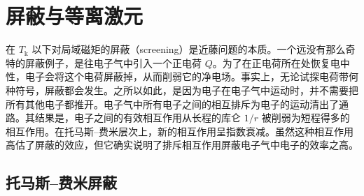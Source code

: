 \chapter{屏蔽与等离激元}

在 $T_{\mathrm{k}}$ 以下对局域磁矩的屏蔽（screening）是近藤问题的本质。一个远没有那么奇特的屏蔽例子，是往电子气中引入一个正电荷 $Q$。为了在正电荷所在处恢复电中性，电子会将这个电荷屏蔽掉，从而削弱它的净电场。事实上，无论试探电荷带何种符号，屏蔽都会发生。之所以如此，是因为电子在电子气中运动时，并不需要把所有其他电子都推开。电子气中所有电子之间的相互排斥为电子的运动清出了通路。其结果是，电子之间的有效相互作用从长程的库仑 $1/r$ 被削弱为短程得多的相互作用。在托马斯–费米层次上，新的相互作用呈指数衰减。虽然这种相互作用高估了屏蔽的效应，但它确实说明了排斥相互作用屏蔽电子气中电子的效率之高。

\section{托马斯–费米屏蔽}

